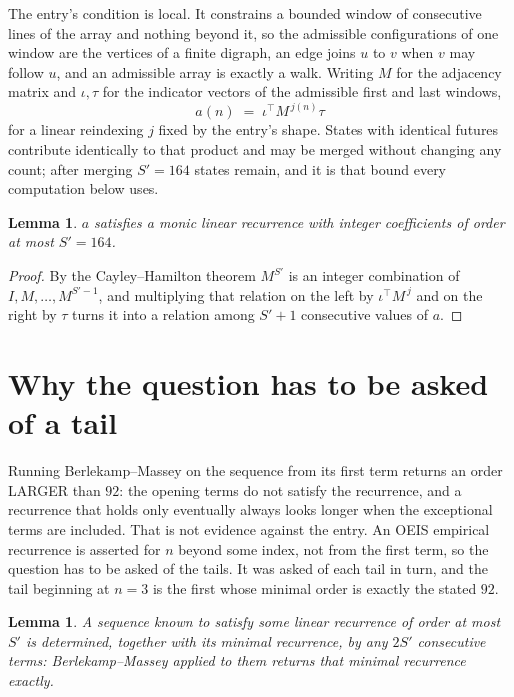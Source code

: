 \documentclass[11pt,a4paper]{article}
\theoremstyle{plain}
\newtheorem{lemma}[theorem]{Lemma}
\theoremstyle{definition}
\begin{document}
The entry's condition is local. It constrains a bounded window of consecutive lines of the
array and nothing beyond it, so the admissible configurations of one window are the vertices of
a finite digraph, an edge joins $u$ to $v$ when $v$ may follow $u$, and an admissible array is
exactly a walk. Writing $M$ for the adjacency matrix and $\iota,\tau$ for the indicator vectors
of the admissible first and last windows,
\[
a(n)\;=\;\iota^{\!\top}M^{\,j(n)}\tau
\]
for a linear reindexing $j$ fixed by the entry's shape. States with identical futures
contribute identically to that product and may be merged without changing any count; after
merging $S'=164$ states remain, and it is that bound every computation below uses.

\begin{lemma}\label{lem:cf}
$a$ satisfies a monic linear recurrence with integer coefficients of order at most $S'=164$.
\end{lemma}

\begin{proof}
By the Cayley--Hamilton theorem $M^{S'}$ is an integer combination of $I,M,\dots,M^{S'-1}$,
and multiplying that relation on the left by $\iota^{\!\top}M^{\,j}$ and on the right by
$\tau$ turns it into a relation among $S'+1$ consecutive values of $a$.
\end{proof}

\section{Why the question has to be asked of a tail}

Running Berlekamp--Massey on the sequence from its first term returns an order LARGER than $92$: the opening terms do not satisfy the recurrence, and a recurrence that holds only eventually always looks longer when the exceptional terms are included. That is not evidence against the entry. An OEIS empirical recurrence is asserted for $n$ beyond some index, not from the first term, so the question has to be asked of the tails. It was asked of each tail in turn, and the tail beginning at $n=3$ is the first whose minimal order is exactly the stated $92$.

\begin{lemma}\label{lem:bm}
A sequence known to satisfy some linear recurrence of order at most $S'$ is determined,
together with its minimal recurrence, by any $2S'$ consecutive terms: Berlekamp--Massey applied
to them returns that minimal recurrence exactly.
\end{lemma}
\end{document}
